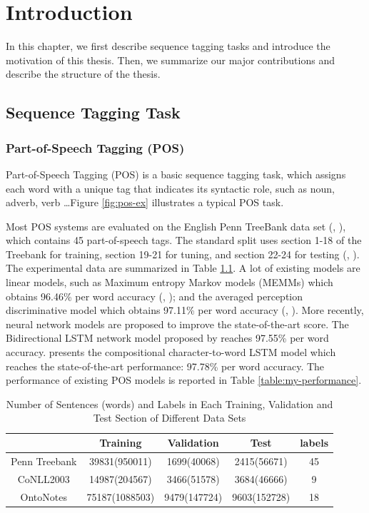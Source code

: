 \chapter{Introduction}

In this chapter, we first describe sequence tagging tasks and introduce the motivation of this thesis. Then, we summarize our major contributions and describe the structure of the thesis.

\section{Sequence Tagging Task}

\subsection{Part-of-Speech Tagging (POS)}
Part-of-Speech Tagging (POS) is a basic sequence tagging task, which assigns each word with a unique tag that indicates its syntactic role, such as noun, adverb, verb \dots Figure \ref{fig:pos-ex} illustrates a typical POS task. 

Most POS systems are evaluated on the English Penn TreeBank data set (\citeauthor{marcus1993building}, \citeyear{marcus1993building}), which contains 45 part-of-speech tags. The standard split uses section 1-18 of the Treebank for training, section 19-21 for tuning, and section 22-24 for testing (\citeauthor{toutanova2003feature}, \citeyear{toutanova2003feature}). The experimental data are summarized in Table \ref{table:my-dataset}. A lot of existing models are linear models, such as Maximum entropy Markov models (MEMMs) which obtains 96.46\% per word accuracy (\citeauthor{mccallum2000maximum}, \citeyear{mccallum2000maximum}); and the averaged perception discriminative model which obtains 97.11\% per word accuracy (\citeauthor{collins2002discriminative}, \citeyear{collins2002discriminative}). More recently, neural network models are proposed to improve the state-of-the-art score. The Bidirectional LSTM network model proposed by \cite{huang2015bidirectional} reaches 97.55\% per word accuracy. \cite{ling2015finding} presents the compositional character-to-word LSTM model which reaches the state-of-the-art performance: 97.78\% per word accuracy. The performance of existing POS models is reported in Table \ref{table:my-performance}.

\begin{table}[]
\centering
\caption{Number of Sentences (words) and Labels in Each Training, Validation and Test Section of Different Data Sets}
\label{table:my-dataset}
\begin{tabular}{|c|c|c|c|c|} \hline
      & Training  & Validation  & Test  & labels  \\ \hline
Penn Treebank   &39831(950011) &1699(40068) &2415(56671) &45\\\hline
CoNLL2003   &14987(204567) &3466(51578) &3684(46666) &9     \\\hline
OntoNotes   &75187(1088503) &9479(147724) &9603(152728) &18     \\\hline
\end{tabular}
\end{table}


